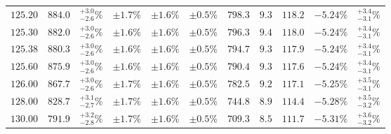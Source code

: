 \begin{table}[ht!]
{{\begin{tabular}{| cc | c | ccc | cccc | c |}
$125.20$ & $884.0$ & $^{+3.0}_{-2.6}\%$ & $\pm 1.7\%$ & {\color{black!55}$\pm 1.6\%$} & {\color{black!55}$\pm 0.5\%$} & $798.3$ & $9.3$ & $118.2$ & $-5.24\%$ & $^{+3.4}_{-3.1}\%$ \\
$125.30$ & $882.0$ & $^{+3.0}_{-2.6}\%$ & $\pm 1.6\%$ & {\color{black!55}$\pm 1.6\%$} & {\color{black!55}$\pm 0.5\%$} & $796.3$ & $9.4$ & $118.0$ & $-5.24\%$ & $^{+3.4}_{-3.1}\%$ \\
$125.38$ & $880.3$ & $^{+3.0}_{-2.6}\%$ & $\pm 1.6\%$ & {\color{black!55}$\pm 1.6\%$} & {\color{black!55}$\pm 0.5\%$} & $794.7$ & $9.3$ & $117.9$ & $-5.24\%$ & $^{+3.4}_{-3.1}\%$ \\
$125.60$ & $875.9$ & $^{+3.0}_{-2.6}\%$ & $\pm 1.6\%$ & {\color{black!55}$\pm 1.6\%$} & {\color{black!55}$\pm 0.5\%$} & $790.4$ & $9.3$ & $117.6$ & $-5.24\%$ & $^{+3.4}_{-3.1}\%$ \\
$126.00$ & $867.7$ & $^{+3.0}_{-2.6}\%$ & $\pm 1.7\%$ & {\color{black!55}$\pm 1.6\%$} & {\color{black!55}$\pm 0.5\%$} & $782.5$ & $9.2$ & $117.1$ & $-5.25\%$ & $^{+3.5}_{-3.1}\%$ \\
$128.00$ & $828.7$ & $^{+3.1}_{-2.7}\%$ & $\pm 1.7\%$ & {\color{black!55}$\pm 1.6\%$} & {\color{black!55}$\pm 0.5\%$} & $744.8$ & $8.9$ & $114.4$ & $-5.28\%$ & $^{+3.5}_{-3.2}\%$ \\
$130.00$ & $791.9$ & $^{+3.2}_{-2.8}\%$ & $\pm 1.7\%$ & {\color{black!55}$\pm 1.6\%$} & {\color{black!55}$\pm 0.5\%$} & $709.3$ & $8.5$ & $111.7$ & $-5.31\%$ & $^{+3.6}_{-3.2}\%$ \\
\cline{1-11}
\end{tabular}
}
}
\end{table}

